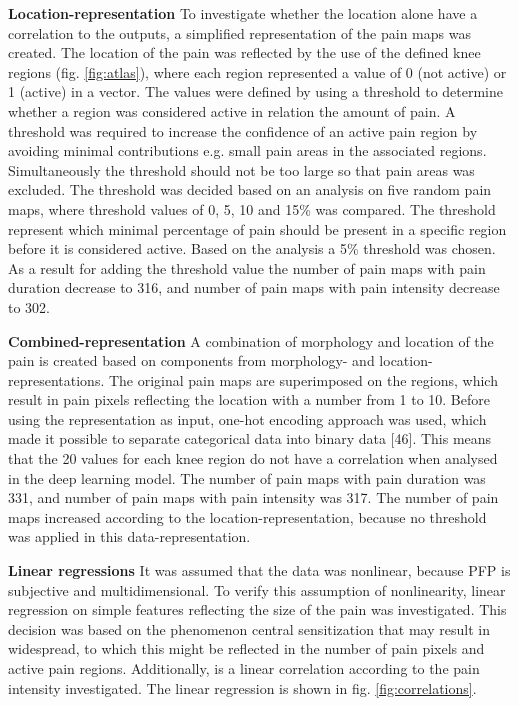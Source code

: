 \noindent
\textbf{Location-representation} \newline
\noindent
To investigate whether the location alone have a correlation to the outputs, a simplified representation of the pain maps was created. The location of the pain was reflected by the use of the defined knee regions (fig. \ref{fig:atlas}), where each region represented a value of 0 (not active) or 1 (active) in a vector.  The values were defined by using a threshold to determine whether a region was considered active in relation the amount of pain. A threshold was required to increase the confidence of an active pain region by avoiding minimal contributions e.g. small pain areas in the associated regions. Simultaneously the threshold should not be too large so that pain areas was excluded. The threshold was decided based on an analysis on five random pain maps, where threshold values of 0, 5, 10 and 15\% was compared. The threshold represent which minimal percentage of pain should be present in a specific region before it is considered active. Based on the analysis a 5\% threshold was chosen. As a result for adding the threshold value the number of pain maps with pain duration decrease to 316, and number of pain maps with pain intensity decrease to 302.  \newline

\noindent
\textbf{Combined-representation} \newline
\noindent
A combination of morphology and location of the pain is created based on components from morphology- and location-representations. The original pain maps are superimposed on the regions, which result in pain pixels reflecting the location with a number from 1 to 10. Before using the representation as input, one-hot encoding approach was used, which made it possible to separate categorical data into binary data [46]. This means that the 20 values for each knee region do not have a correlation when analysed in the deep learning model. The number of pain maps with pain duration was 331, and number of pain maps with pain intensity was 317. The number of pain maps increased according to the location-representation, because no threshold was applied in this data-representation. 



\noindent
\textbf{Linear regressions} \newline
\noindent
It was assumed that the data was nonlinear, because PFP is subjective and multidimensional. To verify this assumption of nonlinearity, linear regression on simple features reflecting the size of the pain was investigated. This decision was based on the phenomenon central sensitization that may result in widespread, to which this might be reflected in the number of pain pixels and active pain regions. 
Additionally, is a linear correlation according to the pain intensity investigated. The linear regression is shown in fig. \ref{fig:correlations}.



